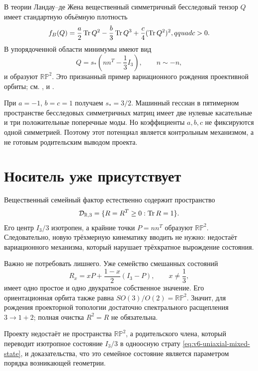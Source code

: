В теории Ландау--де Жена вещественный симметричный бесследовый тензор
$Q$ имеет стандартную объёмную плотность
\begin{equation}
 f_B(Q)=\frac a2\operatorname{Tr} Q^2-\frac b3\operatorname{Tr} Q^3
       +\frac c4(\operatorname{Tr} Q^2)^2,qquad c>0.
 \label{eq:v6-ldg-control}
\end{equation}
В упорядоченной области минимумы имеют вид
\begin{equation}
 Q=s_\ast\left(nn^T-\frac13I_3\right),\qquad n\sim-n,
 \label{eq:v6-ldg-rp2-minima}
\end{equation}
и образуют $\mathbb{RP}^2$. Это признанный пример вариационного рождения
проективной орбиты; см. ,
 и .

При $a=-1$, $b=c=1$ получаем $s_\ast=3/2$. Машинный гессиан в
пятимерном пространстве бесследовых симметричных матриц имеет две нулевые
касательные и три положительные поперечные моды. Но коэффициенты $a,b,c$
не фиксируются одной симметрией. Поэтому этот потенциал является
контрольным механизмом, а не готовым родительским выводом проекта.

\section{Носитель уже присутствует}

Вещественный семейный фактор естественно содержит пространство
\begin{equation}
 \mathcal D_{\mathbb R,3}
 =\{R=R^T\geq0:\operatorname{Tr} R=1\}.
 \label{eq:v6-real-state-space}
\end{equation}
Его центр $I_3/3$ изотропен, а крайние точки $P=nn^T$ образуют
$\mathbb{RP}^2$. Следовательно, новую трёхмерную кинематику вводить не
нужно: недостаёт вариационного механизма, который нарушает трёхкратное
вырождение состояния.

Важно не потребовать лишнего. Уже семейство смешанных состояний
\begin{equation}
 R_x=xP+\frac{1-x}{2}(I_3-P),\qquad x\ne\frac13,
 \label{eq:v6-uniaxial-mixed-state}
\end{equation}
имеет одно простое и одно двукратное собственное значение. Его
ориентационная орбита также равна $SO(3)/O(2)=\mathbb{RP}^2$. Значит,
для рождения проекторной топологии достаточно спектрального расщепления
$3\to1+2$; полная очистка $R^2=R$ не обязательна.

\begin{proposition}
Проекту недостаёт не пространства $\mathbb{RP}^2$, а родительского
члена, который переводит изотропное состояние $I_3/3$ в одноосную
страту \eqref{eq:v6-uniaxial-mixed-state}, и доказательства, что это
семейное состояние является параметром порядка возникающей геометрии.
\end{proposition}


